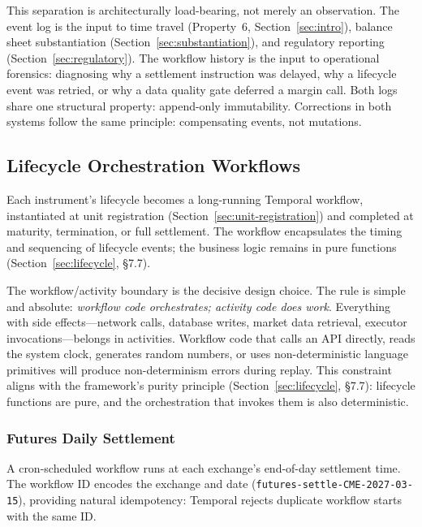 \documentclass[11pt,a4paper]{article}
\begin{document}
\noindent This separation is architecturally load-bearing, not merely an observation. The event log is the input to time travel (Property~6, Section~\ref{sec:intro}), balance sheet substantiation (Section~\ref{sec:substantiation}), and regulatory reporting (Section~\ref{sec:regulatory}). The workflow history is the input to operational forensics: diagnosing why a settlement instruction was delayed, why a lifecycle event was retried, or why a data quality gate deferred a margin call. Both logs share one structural property: append-only immutability. Corrections in both systems follow the same principle: compensating events, not mutations.

\subsection{Lifecycle Orchestration Workflows}
\label{sec:lifecycle-workflows}

Each instrument's lifecycle becomes a long-running Temporal workflow, instantiated at unit registration (Section~\ref{sec:unit-registration}) and completed at maturity, termination, or full settlement. The workflow encapsulates the timing and sequencing of lifecycle events; the business logic remains in pure functions (Section~\ref{sec:lifecycle}, \S7.7).

The workflow/activity boundary is the decisive design choice. The rule is simple and absolute: \emph{workflow code orchestrates; activity code does work}. Everything with side effects---network calls, database writes, market data retrieval, executor invocations---belongs in activities. Workflow code that calls an API directly, reads the system clock, generates random numbers, or uses non-deterministic language primitives will produce non-determinism errors during replay. This constraint aligns with the framework's purity principle (Section~\ref{sec:lifecycle}, \S7.7): lifecycle functions are pure, and the orchestration that invokes them is also deterministic.

\subsubsection{Futures Daily Settlement}

A cron-scheduled workflow runs at each exchange's end-of-day settlement time. The workflow ID encodes the exchange and date (\texttt{futures-settle-CME-2027-03-15}), providing natural idempotency: Temporal rejects duplicate workflow starts with the same ID.
\end{document}
